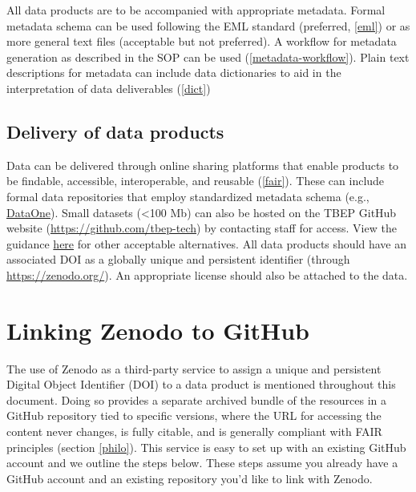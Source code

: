 \documentclass[
]{book}
\begin{document}
All data products are to be accompanied with appropriate metadata. Formal metadata schema can be used following the EML standard (preferred, \ref{eml}) or as more general text files (acceptable but not preferred). A workflow for metadata generation as described in the SOP can be used (\ref{metadata-workflow}). Plain text descriptions for metadata can include data dictionaries to aid in the interpretation of data deliverables (\ref{dict})

\subsection{Delivery of data products}\label{delivery-of-data-products}

Data can be delivered through online sharing platforms that enable products to be findable, accessible, interoperable, and reusable (\ref{fair}). These can include formal data repositories that employ standardized metadata schema (e.g., \href{https://www.dataone.org/}{DataOne}). Small datasets (\textless100 Mb) can also be hosted on the TBEP GitHub website (\url{https://github.com/tbep-tech}) by contacting staff for access. View the guidance \href{https://tbep-tech.github.io/data-management-sop/keys.html\#datahome}{here} for other acceptable alternatives. All data products should have an associated DOI as a globally unique and persistent identifier (through \url{https://zenodo.org/}). An appropriate license should also be attached to the data.

\section{Linking Zenodo to GitHub}\label{zenodo}

The use of Zenodo as a third-party service to assign a unique and persistent Digital Object Identifier (DOI) to a data product is mentioned throughout this document. Doing so provides a separate archived bundle of the resources in a GitHub repository tied to specific versions, where the URL for accessing the content never changes, is fully citable, and is generally compliant with FAIR principles (section \ref{philo}). This service is easy to set up with an existing GitHub account and we outline the steps below. These steps assume you already have a GitHub account and an existing repository you'd like to link with Zenodo.
\end{document}
